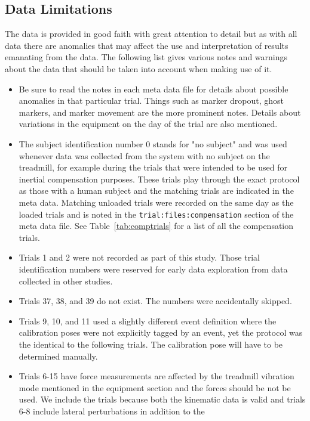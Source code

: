 \documentclass[fleqn,12pt]{wlpeerj}
\begin{document}
\subsection*{Data Limitations}
%
The data is provided in good faith with great attention to detail but as with
all data there are anomalies that may affect the use and interpretation of
results emanating from the data. The following list gives various notes and
warnings about the data that should be taken into account when making use of
it.
%
\begin{itemize}
  \item Be sure to read the notes in each meta data file for details about
    possible anomalies in that particular trial. Things such as marker dropout,
    ghost markers, and marker movement are the more prominent notes. Details
    about variations in the equipment on the day of the trial are also
    mentioned.
  \item The subject identification number 0 stands for "no subject" and was
    used whenever data was collected from the system with no subject on the
    treadmill, for example during the trials that were intended to be used for
    inertial compensation purposes. These trials play through the exact
    protocol as those with a human subject and the matching trials are
    indicated in the meta data. Matching unloaded trials were recorded on the
    same day as the loaded trials and is noted in the
    \verb|trial:files:compensation| section of the meta data file. See
    Table~\ref{tab:comptrials} for a list of all the compensation trials.
  \item Trials 1 and 2 were not recorded as part of this study. Those trial
    identification numbers were reserved for early data exploration from data
    collected in other studies.
  \item Trials 37, 38, and 39 do not exist. The numbers were accidentally
    skipped.
  \item Trials 9, 10, and 11 used a slightly different event definition where the
    calibration poses were not explicitly tagged by an event, yet the protocol
    was the identical to the following trials. The calibration pose will have
    to be determined manually.
  \item  Trials 6-15 have force measurements are affected by the treadmill
    vibration mode mentioned in the equipment section and the forces should be
    not be used. We include the trials because both the kinematic data is valid
    and trials 6-8 include lateral perturbations in addition to the

\end{itemize}
\end{document}
